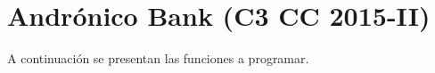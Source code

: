 \section{Andrónico Bank (C3 CC 2015-II)}

  A continuación se presentan las funciones a programar.
  
  